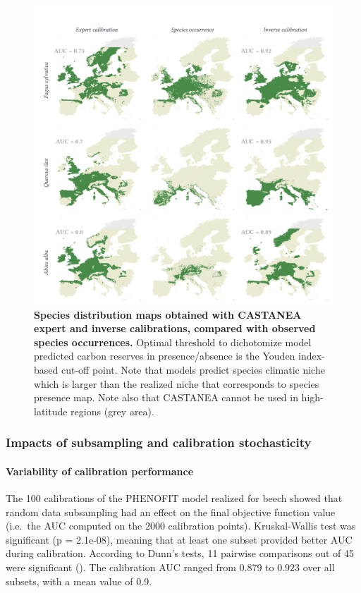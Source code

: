 \begin{figure}
\centering 
\includegraphics{chapter1/figs/castaneamaps} 
\caption{\textbf{Species distribution maps obtained with CASTANEA expert and inverse calibrations, compared with observed species occurrences.} Optimal threshold to dichotomize model predicted carbon reserves in presence/absence is the Youden index-based cut-off point. Note that models predict species climatic niche which is larger than the realized niche that corresponds to species presence map. Note also that CASTANEA cannot be used in high-latitude regions (grey area).}
\label{fig:castaneamaps}
\end{figure}

\subsubsection{Impacts of subsampling and calibration
stochasticity}\label{impacts-of-subsampling-and-calibration-stochasticity}

\paragraph{Variability of calibration
performance}\label{variability-of-calibration-performance}

The 100 calibrations of the PHENOFIT model realized for beech showed
that random data subsampling had an effect on the final objective
function value (i.e.~the AUC computed on the 2000 calibration points).
Kruskal-Wallis test was significant (p = 2.1e-08), meaning that at least
one subset provided better AUC during calibration. According to Dunn's
tests, 11 pairwise comparisons out of 45 were significant
(). The calibration AUC ranged
from 0.879 to 0.923 over all subsets, with a mean value of 0.9.

